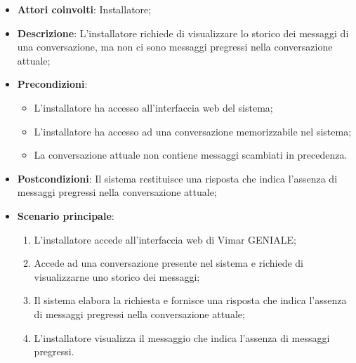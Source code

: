 \begin{itemize}
    \item \textbf{Attori coinvolti}: Installatore;
    \item \textbf{Descrizione}: L’installatore richiede di visualizzare lo storico dei messaggi di una conversazione, ma non ci sono messaggi pregressi nella conversazione attuale;
    \item \textbf{Precondizioni}: 
        \begin{itemize}
            \item L’installatore ha accesso all’interfaccia web del sistema;
            \item L’installatore ha accesso ad una conversazione memorizzabile nel sistema;
            \item La conversazione attuale non contiene messaggi scambiati in precedenza.
        \end{itemize}
    \item \textbf{Postcondizioni}: Il sistema restituisce una risposta che indica l’assenza di messaggi pregressi nella conversazione attuale;
    \item \textbf{Scenario principale}:
    \begin{enumerate}
    \item L’installatore accede all’interfaccia web di Vimar GENIALE;
    \item Accede ad una conversazione presente nel sistema e richiede di visualizzarne uno storico dei messaggi;
    \item Il sistema elabora la richiesta e fornisce una risposta che indica l’assenza di messaggi pregressi nella conversazione attuale;
    \item L’installatore visualizza il messaggio che indica l’assenza di messaggi pregressi.
    \end{enumerate}
\end{itemize}

